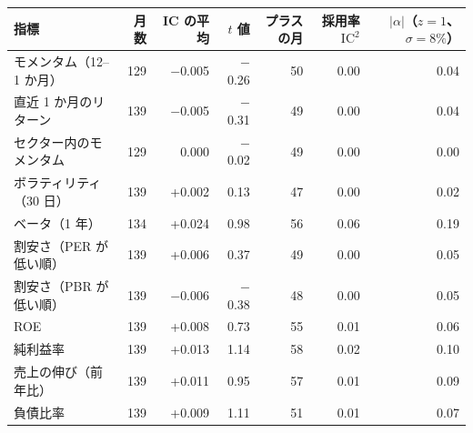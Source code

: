 \begin{tabular}{lrrrrrr}
\toprule
指標 & 月数 & IC の平均 & $t$ 値 & プラスの月 & 採用率 $\mathrm{IC}^2$ & $|\alpha|$（$z=1$、$\sigma=8\%$） \\
\midrule
モメンタム（12--1 か月） & 129 & \ensuremath{-}0.005 & \ensuremath{-}0.26 & 50 & 0.00 & 0.04 \\
直近 1 か月のリターン & 139 & \ensuremath{-}0.005 & \ensuremath{-}0.31 & 49 & 0.00 & 0.04 \\
セクター内のモメンタム & 129 & 0.000 & \ensuremath{-}0.02 & 49 & 0.00 & 0.00 \\
ボラティリティ（30 日） & 139 & +0.002 & 0.13 & 47 & 0.00 & 0.02 \\
ベータ（1 年） & 134 & +0.024 & 0.98 & 56 & 0.06 & 0.19 \\
割安さ（PER が低い順） & 139 & +0.006 & 0.37 & 49 & 0.00 & 0.05 \\
割安さ（PBR が低い順） & 139 & \ensuremath{-}0.006 & \ensuremath{-}0.38 & 48 & 0.00 & 0.05 \\
ROE & 139 & +0.008 & 0.73 & 55 & 0.01 & 0.06 \\
純利益率 & 139 & +0.013 & 1.14 & 58 & 0.02 & 0.10 \\
売上の伸び（前年比） & 139 & +0.011 & 0.95 & 57 & 0.01 & 0.09 \\
負債比率 & 139 & +0.009 & 1.11 & 51 & 0.01 & 0.07 \\
\bottomrule
\end{tabular}
